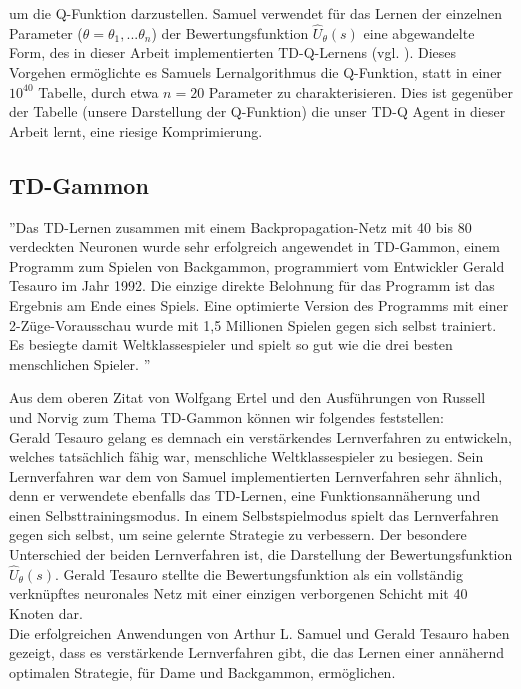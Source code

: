 um die Q-Funktion darzustellen. Samuel verwendet für das Lernen der einzelnen Parameter ($\theta = \theta_1, ... \theta_n$) der Bewertungsfunktion $\hat{U}_\theta(s)$ eine abgewandelte Form, des in dieser Arbeit implementierten TD-Q-Lernens (vgl. \cite[981]{Russell}). Dieses Vorgehen ermöglichte es Samuels Lernalgorithmus die Q-Funktion, statt in einer $10^{40}$ Tabelle, durch etwa $n = 20$ Parameter zu charakterisieren. Dies ist gegenüber der Tabelle (unsere Darstellung der Q-Funktion) die unser TD-Q Agent in dieser Arbeit lernt, eine riesige Komprimierung. \\

\subsection{TD-Gammon}
\label{subsec:TD-Gammon}
''Das TD-Lernen zusammen mit einem Backpropagation-Netz mit 40 bis 80 verdeckten Neuronen wurde sehr erfolgreich angewendet in TD-Gammon, einem Programm zum Spielen von Backgammon, programmiert vom Entwickler Gerald Tesauro im Jahr 1992. Die einzige direkte Belohnung für das Programm ist das Ergebnis am Ende eines Spiels. Eine optimierte Version des Programms mit einer 2-Züge-Vorausschau wurde mit 1,5 Millionen Spielen gegen sich selbst trainiert. Es besiegte damit Weltklassespieler und spielt so gut wie die drei besten menschlichen Spieler. \cite[304]{Ertel}''

Aus dem oberen Zitat von Wolfgang Ertel und den Ausführungen von Russell und Norvig \cite[982]{Russell} zum Thema TD-Gammon können wir folgendes feststellen: \\

Gerald Tesauro gelang es demnach ein verstärkendes Lernverfahren zu entwickeln, welches tatsächlich fähig war, menschliche Weltklassespieler zu besiegen. Sein Lernverfahren war dem von Samuel implementierten Lernverfahren sehr ähnlich, denn er verwendete ebenfalls das TD-Lernen, eine Funktionsannäherung und einen Selbsttrainingsmodus. In einem Selbstspielmodus spielt das Lernverfahren gegen sich selbst, um seine gelernte Strategie zu verbessern. Der besondere Unterschied der beiden Lernverfahren ist, die Darstellung der Bewertungsfunktion $\hat{U}_\theta(s)$. Gerald Tesauro stellte die Bewertungsfunktion als ein vollständig verknüpftes neuronales Netz mit einer einzigen verborgenen Schicht mit 40 Knoten dar. \\

Die erfolgreichen Anwendungen von Arthur L. Samuel und Gerald Tesauro haben gezeigt, dass es verstärkende Lernverfahren gibt, die das Lernen einer annähernd optimalen Strategie, für Dame und Backgammon, ermöglichen. \\